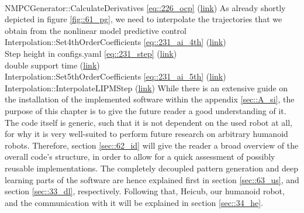 \\
NMPCGenerator::CalculateDerivatives \ref{eq::226_ocp}
(\href{https://github.com/mhubii/nmpc_pattern_generator/blob/dc1f5a9366cbbbf76f1b02cada642f6ac9a04c89/libs/pattern_generator/src/nmpc_generator.cpp#L377}{\underline{link}})
As already shortly depicted in figure \ref{fig::61_pg}, we need to interpolate the trajectories that we obtain from the nonlinear model predictive control
Interpolation::Set4thOrderCoefficients \ref{eq::231_ai_4th}
(\href{https://github.com/mhubii/nmpc_pattern_generator/blob/c82c64a28da7527e75442764f585bd50a8f61ee9/libs/pattern_generator/src/interpolation.cpp#L779}{\underline{link}})
\\
Step height in configs.yaml \ref{eq::231_step}
(\href{https://github.com/mhubii/nmpc_pattern_generator/blob/c82c64a28da7527e75442764f585bd50a8f61ee9/libs/pattern_generator/configs.yaml#L22}{\underline{link}})
\\
double support time 
(\href{https://github.com/mhubii/nmpc_pattern_generator/blob/c82c64a28da7527e75442764f585bd50a8f61ee9/libs/pattern_generator/configs.yaml#L21}{\underline{link}})
\\
Interpolation::Set5thOrderCoefficients \ref{eq::231_ai_5th}
(\href{https://github.com/mhubii/nmpc_pattern_generator/blob/c82c64a28da7527e75442764f585bd50a8f61ee9/libs/pattern_generator/src/interpolation.cpp#L806}{\underline{link}})
\\
Interpolation::InterpolateLIPMStep
(\href{https://github.com/mhubii/nmpc_pattern_generator/blob/5a213044c927dc6aac9f7e32ce1e5fb472cd67bb/libs/pattern_generator/src/interpolation.cpp#L776}{\underline{link}})
While there is an extensive guide on the installation of the implemented software within the appendix \ref{sec::A_si}, the purpose of this chapter is to give the future reader a good understanding of it. The code itself is generic, such that it is not dependent on the used robot at all, for why it is very well-suited to perform future research on arbitrary humanoid robots. Therefore, section \ref{sec::62_id} will give the reader a broad overview of the overall code's structure, in order to allow for a quick assessment of possibly reusable implementations. The completely decoupled pattern generation and deep learning parts of the software are hence explained first in section \ref{sec::63_us}, and section \ref{sec::33_dl}, respectively. Following that, Heicub, our humanoid robot, and the communication with it will be explained in section \ref{sec::34_he}.
\FloatBarrier

